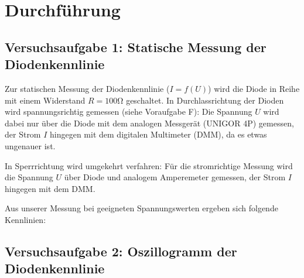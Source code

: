 \section{Durchführung}

\subsection{Versuchsaufgabe 1: Statische Messung der Diodenkennlinie}

Zur statischen Messung der Diodenkennlinie ($I = f(U)$) wird die Diode in Reihe mit einem Widerstand $R = 100 \si{\ohm}$ geschaltet.
In Durchlassrichtung der Dioden wird spannungsrichtig gemessen (siehe Voraufgabe F):
Die Spannung $U$ wird dabei nur über die Diode mit dem analogen Messgerät (UNIGOR 4P) gemessen, 
der Strom $I$ hingegen mit dem digitalen Multimeter (DMM), da es etwas ungenauer ist.

In Sperrrichtung wird umgekehrt verfahren: Für die stromrichtige Messung wird die Spannung $U$ über Diode und analogem Amperemeter gemessen,
der Strom $I$ hingegen mit dem DMM.

Aus unserer Messung bei geeigneten Spannungswerten ergeben sich folgende Kennlinien:



\subsection{Versuchsaufgabe 2: Oszillogramm der Diodenkennlinie}

